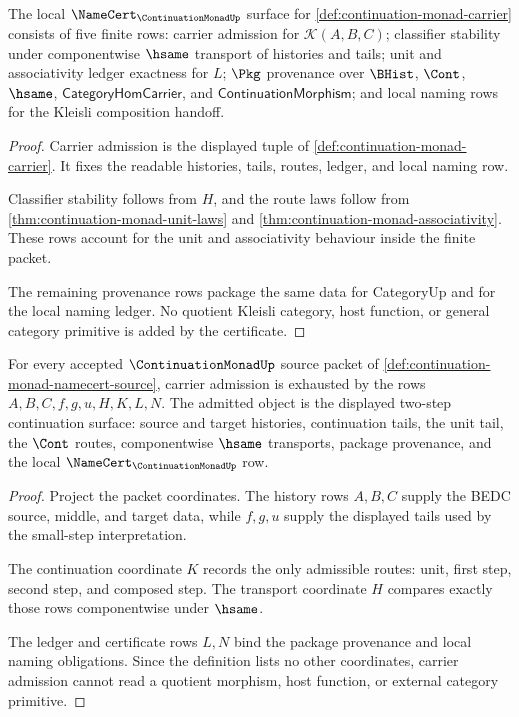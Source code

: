 \begin{theorem}
\label{thm:continuation-monad-namecert-obligations}
The local $\NameCert_{\ContinuationMonadUp}$ surface for \autoref{def:continuation-monad-carrier} consists of five finite rows: carrier admission for $\mathcal{K}(A,B,C)$; classifier stability under componentwise $\hsame$ transport of histories and tails; unit and associativity ledger exactness for $L$; $\Pkg$ provenance over $\BHist$, $\Cont$, $\hsame$, $\mathsf{CategoryHomCarrier}$, and $\mathsf{ContinuationMorphism}$; and local naming rows for the Kleisli composition handoff.
\end{theorem}
\begin{proof}
Carrier admission is the displayed tuple of \autoref{def:continuation-monad-carrier}. It fixes the readable histories, tails, routes, ledger, and local naming row.

Classifier stability follows from $H$, and the route laws follow from \autoref{thm:continuation-monad-unit-laws} and \autoref{thm:continuation-monad-associativity}. These rows account for the unit and associativity behaviour inside the finite packet.

The remaining provenance rows package the same data for CategoryUp and for the local naming ledger. No quotient Kleisli category, host function, or general category primitive is added by the certificate.
\end{proof}

\begin{theorem}
\label{thm:continuation-monad-carrier-obligation}
For every accepted $\ContinuationMonadUp$ source packet of \autoref{def:continuation-monad-namecert-source}, carrier admission is exhausted by the rows $A,B,C,f,g,u,H,K,L,N$. The admitted object is the displayed two-step continuation surface: source and target histories, continuation tails, the unit tail, the $\Cont$ routes, componentwise $\hsame$ transports, package provenance, and the local $\NameCert_{\ContinuationMonadUp}$ row.
\end{theorem}
\begin{proof}
Project the packet coordinates. The history rows $A,B,C$ supply the BEDC source, middle, and target data, while $f,g,u$ supply the displayed tails used by the small-step interpretation.

The continuation coordinate $K$ records the only admissible routes: unit, first step, second step, and composed step. The transport coordinate $H$ compares exactly those rows componentwise under $\hsame$.

The ledger and certificate rows $L,N$ bind the package provenance and local naming obligations. Since the definition lists no other coordinates, carrier admission cannot read a quotient morphism, host function, or external category primitive.
\end{proof}

